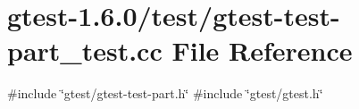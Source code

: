 \hypertarget{gtest-test-part__test_8cc}{\section{gtest-\/1.6.0/test/gtest-\/test-\/part\-\_\-test.cc \-File \-Reference}
\label{d3/d32/gtest-test-part__test_8cc}
}
{\ttfamily \#include \char`\"{}gtest/gtest-\/test-\/part.\-h\char`\"{}}\*
{\ttfamily \#include \char`\"{}gtest/gtest.\-h\char`\"{}}\*
